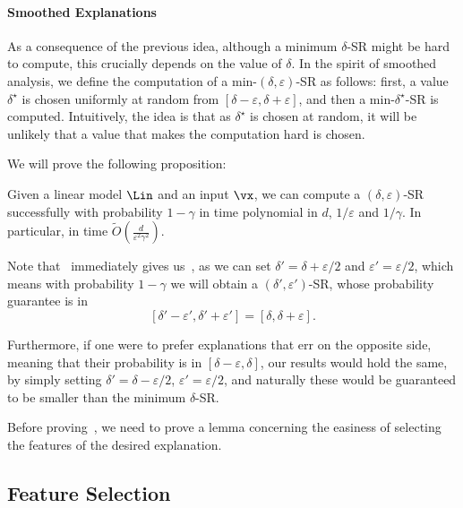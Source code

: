  \paragraph{Smoothed Explanations} As a consequence of the previous idea, although a minimum $\delta$-SR might be hard to compute, this crucially depends on the value of $\delta$. In the spirit of smoothed analysis, we define the computation of a min-$(\delta, \varepsilon)$-SR as follows: first, a value $\delta^\star$ is chosen uniformly at random from $[\delta-\varepsilon, \delta+\varepsilon]$, and then a min-$\delta^\star$-SR is computed. Intuitively, the idea is that as $\delta^\star$ is chosen at random, it will be unlikely that a value that makes the computation hard is chosen. 

 We will prove the following proposition:

\begin{proposition}
    \label{prop:smoothed-explanation}
    Given a linear model $\Lin$ and an input $\vx$, we can compute a $(\delta, \varepsilon)$-SR successfully with probability $1 - \gamma$ in time polynomial in $d$, $1/\varepsilon$ and $1/\gamma$. In particular, in time $\tilde{O}\left( \frac{d}{\varepsilon^2\gamma^2}\right)$.
\end{proposition}

Note that~ immediately gives us~, as we can set $\delta' =  \delta+\varepsilon/2$ and $\varepsilon' = \varepsilon/2$, which means with probability $1 - \gamma$ we will obtain a $(\delta', \varepsilon')$-SR, whose probability guarantee is in 
\[
  [\delta' - \varepsilon', \delta' + \varepsilon'] =  [\delta, \delta + \varepsilon].
\]

Furthermore, if one were to prefer explanations that err on the opposite side, meaning that their probability is in $[\delta - \varepsilon, \delta]$, our results would hold the same, by simply setting $\delta' = \delta - \varepsilon/2$, $\varepsilon' = \varepsilon/2$, and naturally these would be guaranteed to be smaller than the minimum $\delta$-SR.

Before proving~, we need to prove a lemma concerning the easiness of selecting the features of the desired explanation.

\subsection{Feature Selection}

